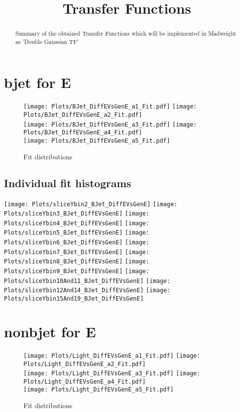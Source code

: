 \documentclass[a4paper,10pt]{article}
\title{Transfer Functions}
\begin{document}
 
\maketitle 
\begin{abstract} 
 Summary of the obtained Transfer Functions which will be implemented in Madweight as 'Double Gaussian TF' \\
\end{abstract} 

\newpage 
\section{bjet for E}
 \begin{figure}[h!b] 
  \texttt{[image: Plots/BJet\_DiffEVsGenE\_a1\_Fit.pdf]} 
  \texttt{[image: Plots/BJet\_DiffEVsGenE\_a2\_Fit.pdf]} \\ 
  \texttt{[image: Plots/BJet\_DiffEVsGenE\_a3\_Fit.pdf]} 
  \texttt{[image: Plots/BJet\_DiffEVsGenE\_a4\_Fit.pdf]} \\ 
  \texttt{[image: Plots/BJet\_DiffEVsGenE\_a5\_Fit.pdf]} 
 \caption{Fit distributions} 
\end{figure} 
\newpage 
\subsection{Individual fit histograms} 
\texttt{[image: Plots/sliceYbin2\_BJet\_DiffEVsGenE]} 
\texttt{[image: Plots/sliceYbin3\_BJet\_DiffEVsGenE]} 
\texttt{[image: Plots/sliceYbin4\_BJet\_DiffEVsGenE]} 
\texttt{[image: Plots/sliceYbin5\_BJet\_DiffEVsGenE]} 
\texttt{[image: Plots/sliceYbin6\_BJet\_DiffEVsGenE]} 
\texttt{[image: Plots/sliceYbin7\_BJet\_DiffEVsGenE]} 
\texttt{[image: Plots/sliceYbin8\_BJet\_DiffEVsGenE]} 
\texttt{[image: Plots/sliceYbin9\_BJet\_DiffEVsGenE]} 
\texttt{[image: Plots/sliceYbin10And11\_BJet\_DiffEVsGenE]} 
\texttt{[image: Plots/sliceYbin12And14\_BJet\_DiffEVsGenE]} 
\texttt{[image: Plots/sliceYbin15And19\_BJet\_DiffEVsGenE]} 
 

\newpage 
\section{nonbjet for E}
 \begin{figure}[h!b] 
  \texttt{[image: Plots/Light\_DiffEVsGenE\_a1\_Fit.pdf]} 
  \texttt{[image: Plots/Light\_DiffEVsGenE\_a2\_Fit.pdf]} \\ 
  \texttt{[image: Plots/Light\_DiffEVsGenE\_a3\_Fit.pdf]} 
  \texttt{[image: Plots/Light\_DiffEVsGenE\_a4\_Fit.pdf]} \\ 
  \texttt{[image: Plots/Light\_DiffEVsGenE\_a5\_Fit.pdf]} 
 \caption{Fit distributions} 
\end{figure} 
\newpage 
\end{document}
